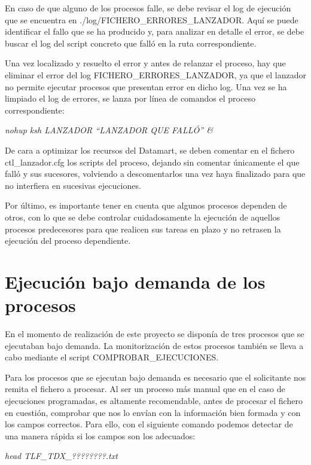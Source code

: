 \documentclass[a4paper, 12pt]{book}
\begin{document}
En caso de que alguno de los procesos falle, se debe revisar el log de ejecución que se encuentra en ./log/FICHERO\_ERRORES\_LANZADOR. Aquí se puede identificar el fallo que se ha producido y, para analizar en detalle el error, se debe buscar el log del script concreto que falló en la ruta correspondiente.

Una vez localizado y resuelto el error y antes de relanzar el proceso, hay que eliminar el error del log FICHERO\_ERRORES\_LANZADOR, ya que el lanzador no permite ejecutar procesos que presentan error en dicho log. Una vez se ha limpiado el log de errores, se lanza por línea de comandos el proceso correspondiente:

\begin{center}
	\textit{nohup ksh LANZADOR ``LANZADOR QUE FALLÓ'' \&}
\end{center}

De cara a optimizar los recursos del Datamart, se deben comentar en el fichero ctl\_lanzador.cfg los scripts del proceso, dejando sin comentar únicamente el que falló y sus sucesores, volviendo a descomentarlos una vez haya finalizado para que no interfiera en sucesivas ejecuciones.

Por último, es importante tener en cuenta que algunos procesos dependen de otros, con lo que se debe controlar cuidadosamente la ejecución de aquellos procesos predecesores para que realicen sus tareas en plazo y no retrasen la ejecución del proceso dependiente.

\section{Ejecución bajo demanda de los procesos} 
\label{sec:ejecucion_demanda}
En el momento de realización de este proyecto se disponía de tres procesos que se ejecutaban bajo demanda. La monitorización de estos procesos también se lleva a cabo mediante el script COMPROBAR\_EJECUCIONES.

Para los procesos que se ejecutan bajo demanda es necesario que el solicitante nos remita el fichero a procesar. Al ser un proceso más manual que en el caso de ejecuciones programadas, es altamente recomendable, antes de procesar el fichero en cuestión, comprobar que nos lo envían con la información bien formada y con los campos correctos. Para ello, con el siguiente comando podemos detectar de una manera rápida si los campos son los adecuados:
\begin{center}
	\textit{head TLF\_TDX\_????????.txt}
\end{center}
\end{document}
